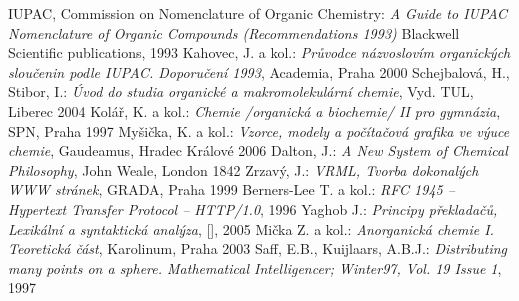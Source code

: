 \begin{thebibliography}{99}	 %
	IUPAC, Commission on Nomenclature of Organic Chemistry:
		\textsl{A Guide to IUPAC Nomenclature of Organic Compounds (Recommendations 1993)}
		Blackwell Scientific publications, 1993
	Kahovec, J. a kol.:
		\textsl{Průvodce názvoslovím organických sloučenin podle IUPAC. Doporučení 1993},
		Academia, Praha 2000
	Schejbalová, H., Stibor, I.:
		\textsl{Úvod do studia organické a ma\-kro\-mo\-le\-ku\-lár\-ní chemie},
		Vyd. TUL, Liberec 2004
	Kolář, K. a kol.:
		\textsl{Chemie /organická a biochemie/ II pro gymnázia},
		SPN, Praha 1997
	Myšička, K. a kol.:
		\textsl{Vzorce, modely a počítačová grafika ve výuce chemie},
		Gaudeamus, Hradec Králové 2006
	Dalton, J.:
		\textsl{A New System of Chemical Philosophy},
		John Weale, London 1842
	Zrzavý, J.:
		\textsl{VRML, Tvorba dokonalých WWW stránek},
		GRADA, Praha 1999
	Berners-Lee T. a kol.:
		\textsl{RFC 1945 -- Hypertext Transfer Protocol -- HTTP/1.0},
		1996
	Yaghob J.:
		\textsl{Principy překladačů, Lexikální a syntaktická analýza},
		[], 2005
	Mička Z. a kol.:
		\textsl{Anorganická chemie I. Teoretická část},
		Karolinum, Praha 2003
	Saff, E.B., Kuijlaars, A.B.J.:
		\textsl{Distributing many points on a sphere. Mathematical Intelligencer; Winter97, Vol. 19 Issue 1},
		1997
\end{thebibliography}
